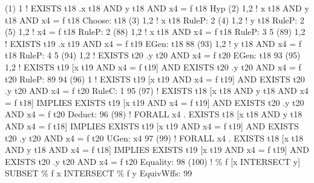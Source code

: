 \begin{tpsexample}
(1)   1      !  EXISTS t18 .x t18 AND y t18 AND x4 = f t18                   Hyp
(2)   1,2    !  x t18 AND y t18 AND x4 = f t18                       Choose: t18
(3)   1,2    !  x t18                                                   RuleP: 2
(4)   1,2    !  y t18                                                   RuleP: 2
(5)   1,2    !  x4 = f t18                                              RuleP: 2
(88)  1,2    !  x t18 AND x4 = f t18                                  RuleP: 3 5
(89)  1,2    !  EXISTS t19 .x t19 AND x4 = f t19                    EGen: t18 88
(93)  1,2    !  y t18 AND x4 = f t18                                  RuleP: 4 5
(94)  1,2    !  EXISTS t20 .y t20 AND x4 = f t20                    EGen: t18 93
(95)  1,2    !      EXISTS t19 [x t19 AND x4 = f t19]
                 AND EXISTS t20 .y t20 AND x4 = f t20               RuleP: 89 94
(96)  1      !      EXISTS t19 [x t19 AND x4 = f t19]
                 AND EXISTS t20 .y t20 AND x4 = f t20                RuleC: 1 95
(97)         !          EXISTS t18 [x t18 AND y t18 AND x4 = f t18]
                 IMPLIES     EXISTS t19 [x t19 AND x4 = f t19]
                         AND EXISTS t20 .y t20 AND x4 = f t20         Deduct: 96
(98)         !  FORALL x4 .        EXISTS t18 [x t18 AND y t18 AND x4 = f t18]
                            IMPLIES     EXISTS t19 [x t19 AND x4 = f t19]
                                    AND EXISTS t20 .y t20 AND x4 = f t20
                                                                     UGen: x4 97
(99)         !  FORALL x4 .        EXISTS t18 [x t18 AND y t18 AND x4 = f t18]
                            IMPLIES     EXISTS t19 [x t19 AND x4 = f t19]
                                    AND EXISTS t20 .y t20 AND x4 = f t20
                                                                    Equality: 98
(100)        !  \% f [x INTERSECT y] SUBSET \% f x INTERSECT \% f y   EquivWffs: 99
\end{tpsexample}
